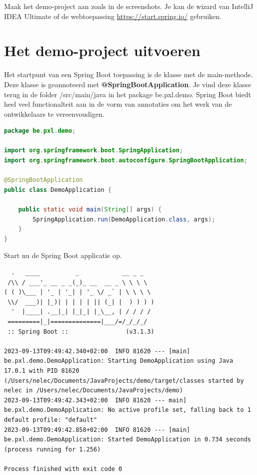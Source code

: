 \begin{oefening}
Maak het demo-project aan zoals in de screenshots. Je kan de wizard van IntelliJ IDEA Ultimate of de webtoepassing \url{https://start.spring.io/} gebruiken.
\end{oefening}

\section{Het demo-project uitvoeren}

Het startpunt van een Spring Boot toepassing is de klasse met de main-methode.
Deze klasse is geannoteerd met \textbf{@SpringBootApplication}. Je vind deze klasse terug in de folder /src/main/java in het package be.pxl.demo.  Spring Boot biedt heel veel functionalteit aan in de vorm van annotaties om het werk van de ontwikkelaars te vereenvoudigen.   

\begin{lstlisting}[frame=single, language=java]
package be.pxl.demo;

import org.springframework.boot.SpringApplication;
import org.springframework.boot.autoconfigure.SpringBootApplication;

@SpringBootApplication
public class DemoApplication {

	public static void main(String[] args) {
		SpringApplication.run(DemoApplication.class, args);
	}
}
\end{lstlisting}

Start nu de Spring Boot applicatie op.

\begin{small}
\begin{verbatim}
  .   ____          _            __ _ _
 /\\ / ___'_ __ _ _(_)_ __  __ _ \ \ \ \
( ( )\___ | '_ | '_| | '_ \/ _` | \ \ \ \
 \\/  ___)| |_)| | | | | || (_| |  ) ) ) )
  '  |____| .__|_| |_|_| |_\__, | / / / /
 =========|_|==============|___/=/_/_/_/
 :: Spring Boot ::                (v3.1.3)

2023-09-13T09:49:42.340+02:00  INFO 81620 --- [main] be.pxl.demo.DemoApplication: Starting DemoApplication using Java 17.0.1 with PID 81620 (/Users/nelec/Documents/JavaProjects/demo/target/classes started by nelec in /Users/nelec/Documents/JavaProjects/demo)
2023-09-13T09:49:42.343+02:00  INFO 81620 --- main] be.pxl.demo.DemoApplication: No active profile set, falling back to 1 default profile: "default"
2023-09-13T09:49:42.858+02:00  INFO 81620 --- [main] be.pxl.demo.DemoApplication: Started DemoApplication in 0.734 seconds (process running for 1.256)

Process finished with exit code 0
\end{verbatim}
\end{small}

